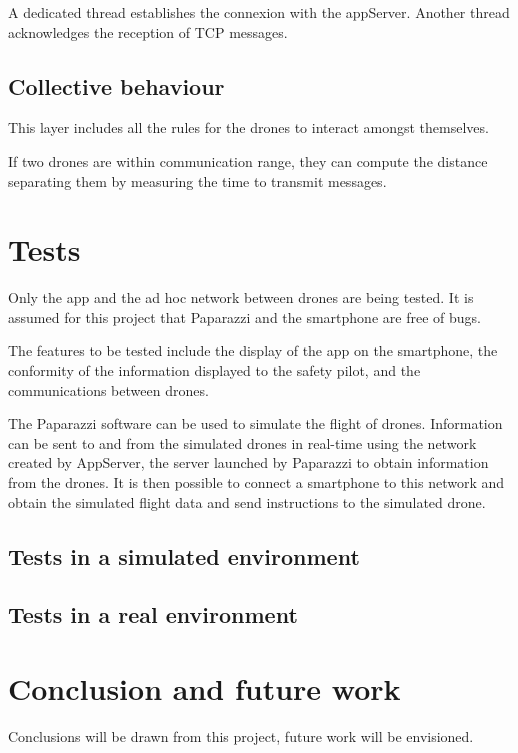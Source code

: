 \documentclass[conference]{IEEEtran}
\begin{document}
A dedicated thread establishes the connexion with the appServer. Another thread acknowledges the reception of TCP messages.

\subsection{Collective behaviour}
This layer includes all the rules for the drones to interact amongst themselves.

If two drones are within communication range, they can compute the distance separating them by measuring the time to transmit messages.


\section{Tests}
Only the app and the ad hoc network between drones are being tested. It is assumed for this project that Paparazzi and the smartphone are free of bugs. 

The features to be tested include the display of the app on the smartphone, the conformity of the information displayed to the safety pilot, and the communications between drones. 

The Paparazzi software can be used to simulate the flight of drones. Information can be sent to and from the simulated drones in real-time using the network created by AppServer, the server launched by Paparazzi to obtain information from the drones. It is then possible to connect a smartphone to this network and obtain the simulated flight data and send instructions to the simulated drone. 


\subsection{Tests in a simulated environment}

\subsection{Tests in a real environment}


\section{Conclusion and future work}
Conclusions will be drawn from this project, future work will be envisioned. 
\end{document}

